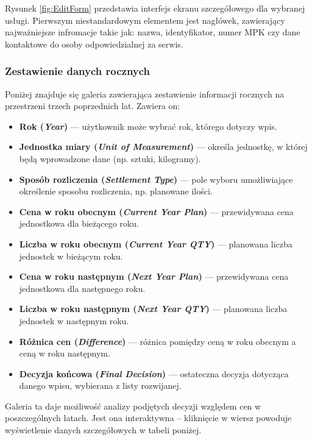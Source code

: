  Rysunek \ref{fig:EditForm} przedstawia interfejs ekranu szczegółowego dla wybranej usługi. Pierwszym niestandardowym elementem jest nagłówek, zawierający najważniejsze infromacje takie jak: nazwa, identyfikator, numer MPK czy dane kontaktowe do osoby odpowiedzialnej za serwis.
\subsubsection*{Zestawienie danych rocznych}
 Poniżej znajduje się galeria zawierająca zestawienie informacji rocznych na przestrzeni trzech poprzednich lat. Zawiera on:
 \begin{itemize}
    \item \textbf{Rok (\emph{Year})} — użytkownik może wybrać rok, którego dotyczy wpis.
    \item \textbf{Jednostka miary (\emph{Unit of Measurement})} — określa jednostkę, w której będą wprowadzone dane (np. sztuki, kilogramy).
    \item \textbf{Sposób rozliczenia (\emph{Settlement Type})} — pole wyboru umożliwiające określenie sposobu rozliczenia, np. planowane ilości.
    \item \textbf{Cena w roku obecnym (\emph{Current Year Plan})} — przewidywana cena jednostkowa dla bieżącego roku.
    \item \textbf{Liczba w roku obecnym (\emph{Current Year QTY})} — planowana liczba jednostek w bieżącym roku.
    \item \textbf{Cena w roku następnym (\emph{Next Year Plan})} — przewidywana cena jednostkowa dla następnego roku.
    \item \textbf{Liczba w roku następnym (\emph{Next Year QTY})} — planowana liczba jednostek w następnym roku.
    \item \textbf{Różnica cen (\emph{Difference})} — różnica pomiędzy ceną w roku obecnym a ceną w roku następnym.
    \item \textbf{Decyzja końcowa (\emph{Final Decision})} — ostateczna decyzja dotycząca danego wpisu, wybierana z listy rozwijanej.
   \end{itemize}

Galeria ta daje możliwość analizy podjętych decyzji względem cen w poszczególnych latach. Jest ona interaktywna -- kliknięcie w wiersz powoduje wyświetlenie danych szczegółowych w tabeli poniżej.
